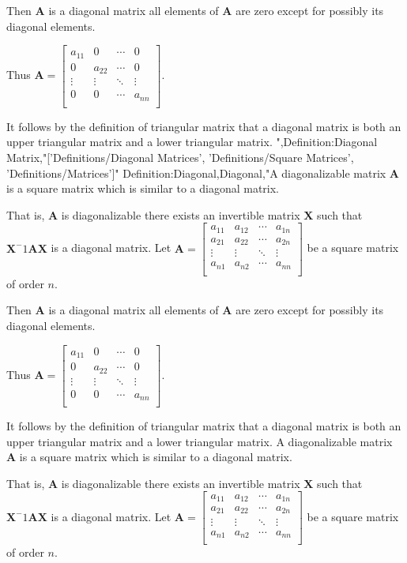 Then $\mathbf A$ is a diagonal matrix  all elements of $\mathbf A$ are zero except for possibly its diagonal elements.


Thus $\mathbf A = \begin{bmatrix}
a_{11} & 0 & \cdots & 0 \\
0 & a_{22} & \cdots & 0 \\
\vdots & \vdots & \ddots & \vdots \\
0 & 0 & \cdots & a_{nn} \\
\end{bmatrix}$.


It follows by the definition of triangular matrix that a diagonal matrix is both an upper triangular matrix and a lower triangular matrix.
",Definition:Diagonal Matrix,"['Definitions/Diagonal Matrices', 'Definitions/Square Matrices', 'Definitions/Matrices']"
Definition:Diagonal,Diagonal,"A diagonalizable matrix $\mathbf A$ is a square matrix which is similar to a diagonal matrix.

That is, $\mathbf A$ is diagonalizable  there exists an invertible matrix $\mathbf X$ such that $\mathbf X^-1 \mathbf A \mathbf X$ is a diagonal matrix.
Let $\mathbf A = \begin{bmatrix}
a_{11} & a_{12} & \cdots & a_{1n} \\
a_{21} & a_{22} & \cdots & a_{2n} \\
\vdots & \vdots & \ddots & \vdots \\
a_{n1} & a_{n2} & \cdots & a_{nn} \\
\end{bmatrix}$ be a square matrix of order $n$.

Then $\mathbf A$ is a diagonal matrix  all elements of $\mathbf A$ are zero except for possibly its diagonal elements.


Thus $\mathbf A = \begin{bmatrix}
a_{11} & 0 & \cdots & 0 \\
0 & a_{22} & \cdots & 0 \\
\vdots & \vdots & \ddots & \vdots \\
0 & 0 & \cdots & a_{nn} \\
\end{bmatrix}$.


It follows by the definition of triangular matrix that a diagonal matrix is both an upper triangular matrix and a lower triangular matrix.
A diagonalizable matrix $\mathbf A$ is a square matrix which is similar to a diagonal matrix.

That is, $\mathbf A$ is diagonalizable  there exists an invertible matrix $\mathbf X$ such that $\mathbf X^-1 \mathbf A \mathbf X$ is a diagonal matrix.
Let $\mathbf A = \begin{bmatrix}
a_{11} & a_{12} & \cdots & a_{1n} \\
a_{21} & a_{22} & \cdots & a_{2n} \\
\vdots & \vdots & \ddots & \vdots \\
a_{n1} & a_{n2} & \cdots & a_{nn} \\
\end{bmatrix}$ be a square matrix of order $n$.


